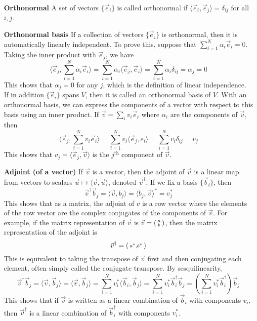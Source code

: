\documentclass{article}
\begin{document}
\textbf{Orthonormal}
A set of vectors $\{\vec e_i\}$ is called orthonormal if $\langle \vec e_i, \vec e_j \rangle = \delta_{ij}$ for all $i,j$.

\textbf{Orthonormal basis}
If a collection of vectors $\{\vec e_i\}$ is orthonormal, then it is automatically linearly independent. To prove this, suppose that $\sum_{i=1}^N \alpha_i \vec e_i = 0$. Taking the inner product with $\vec e_j$, we have
$$
\langle \vec e_j, \sum_{i=1}^N \alpha_i \vec e_i\rangle = \sum_{i=1}^N \alpha_i\langle \vec e_j,  \vec e_i\rangle = \sum_{i=1}^N \alpha_i\delta_{ij} = \alpha_j = 0
$$
This shows that $\alpha_j = 0$ for any $j$, which is the definition of linear independence. If in addition $\{\vec e_i\}$ spans $V$, then it is called an orthonormal basis of $V$. With an orthonormal basis, we can express the components of a vector with respect to this basis using an inner product. If $\vec v = \sum_{i} v_i\vec e_i$ where $\alpha_i$ are the components of $\vec v$, then 
$$
\langle \vec e_j, \sum_{i=1}^N v_i \vec e_i\rangle = \sum_{i=1}^Nv_i\langle \vec e_j, e_i\rangle = \sum_{i=1}^Nv_i\delta_{ij} = v_j
$$
This shows that $v_j = \langle \vec e_j, \vec v\rangle$ is the $j^\text{th}$ component of $\vec v$.

\textbf{Adjoint (of a vector)}
If $\vec v$ is a vector, then the adjoint of $\vec v$ is a linear map from vectors to scalars $\vec u \mapsto \langle \vec v, \vec u\rangle$, denoted $\vec v^\dagger$. If we fix a basis $\{\vec b_i\}$, then 
$$
\vec v^\dagger \vec b_j = \langle \vec v, b_j\rangle = \langle b_j, \vec v\rangle^\ast = v_j^\ast
$$
This shows that as a matrix, the adjoint of $v$ is a row vector where the elements of the row vector are the complex conjugates of the components of $\vec v$. For example, if the matrix representation of $\vec v$ is $\vec v =  \smqty(a \\ b)$, then the matrix representation of the adjoint is
$$
\vec v^\dagger = \smqty(a^\ast, b^\ast)
$$
This is equivalent to taking the transpose of $\vec v$ first and then conjugating each element, often simply called the conjugate transpose. By sesquilinearity,
$$
\vec v^\dagger \vec b_j = \langle \vec v, \vec b_j\rangle = \langle \vec v, \vec b_j\rangle = \sum_{i=1}^N v_i^\ast \langle\vec b_i, \vec b_j\rangle = \sum_{i=1}^N v_i^\ast \vec b_i^\dagger \vec b_j = \left(\sum_{i=1}^N v_i^\ast \vec b_i^\dagger \right)\vec b_j
$$
This shows that if $\vec v$ is written as a linear combination of $\vec b_i$ with components $v_i$, then $\vec v^\dagger$ is a linear combination of $\vec b_i^\dagger$ with components $v_i^\ast$. 
\end{document}
